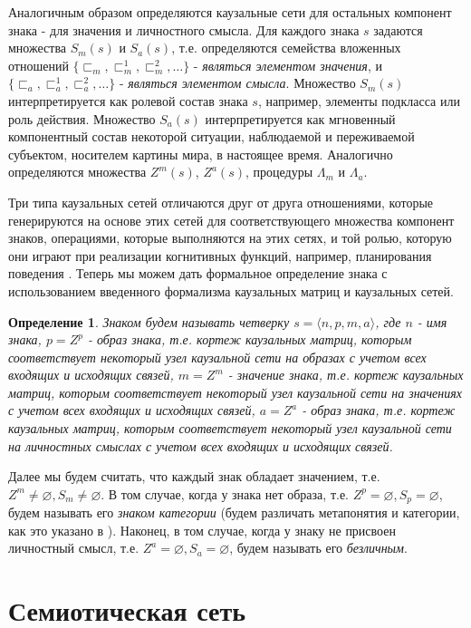 \documentclass[12pt]{scrartcl}
\newtheorem{definition}{Определение}
\begin{document}
	Аналогичным образом определяются каузальные сети для остальных компонент знака - для значения и личностного смысла. Для каждого знака $s$ задаются множества $S_m(s)$ и $S_a(s)$, т.е. определяются семейства вложенных отношений $\{\sqsubset_m,\sqsubset_m^1,\sqsubset_m^2,\dots\}$ - \textit{являться элементом значения}, и $\{\sqsubset_a,\sqsubset_a^1,\sqsubset_a^2,\dots\}$ - \textit{являться элементом смысла}. Множество $S_m(s)$ интерпретируется как ролевой состав знака $s$, например, элементы подкласса или роль действия. Множество $S_a(s)$ интерпретируется как мгновенный компонентный состав некоторой ситуации, наблюдаемой и переживаемой субъектом, носителем картины мира, в настоящее время. Аналогично определяются множества $Z^m(s)$, $Z^a(s)$, процедуры $\Lambda_m$ и $\Lambda_a$.
	
	Три типа каузальных сетей отличаются друг от друга отношениями, которые генерируются на основе этих сетей для соответствующего множества компонент знаков, операциями, которые выполняются на этих сетях, и той ролью, которую они играют при реализации когнитивных функций, например, планирования поведения \cite{Osipov2015d}. Теперь мы можем дать формальное определение знака \cite{Osipov2015c} с использованием введенного формализма каузальных матриц и каузальных сетей.
	
	\begin{definition}
		Знаком будем называть четверку $s=\langle n, p, m, a \rangle$, где $n$ - имя знака, $p=Z^p$ - образ знака, т.е. кортеж каузальных матриц, которым соответствует некоторый узел каузальной сети на образах с учетом всех входящих и исходящих связей, $m=Z^m$ - значение знака, т.е. кортеж каузальных матриц, которым соответствует некоторый узел каузальной сети на значениях  с учетом всех входящих и исходящих связей, $a=Z^a$ - образ знака, т.е. кортеж каузальных матриц, которым соответствует некоторый узел каузальной сети на личностных смыслах  с учетом всех входящих и исходящих связей.
	\end{definition}
	
	Далее мы будем считать, что каждый знак обладает значением, т.е. $Z^m\not = \varnothing, S_m\not=\varnothing$. В том случае, когда у знака нет образа, т.е. $Z^p=\varnothing,S_p=\varnothing$, будем называть его \textit{знаком категории} (будем различать метапонятия и категории, как это указано в \cite{Osipov1997}). Наконец, в том случае, когда у знаку не присвоен личностный смысл, т.е. $Z^a=\varnothing, S_a=\varnothing$, будем называть его \textit{безличным}.
	
	\section{Семиотическая сеть}\label{sec:semnetwork}
	
\end{document}
